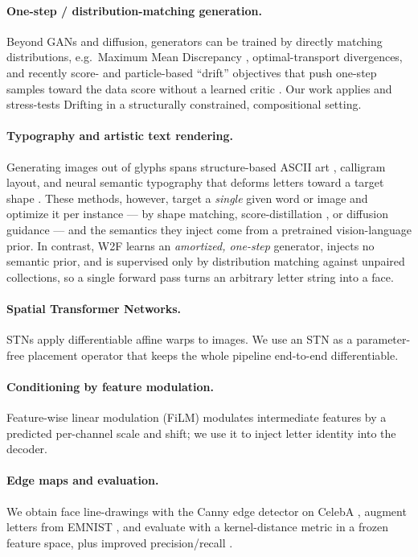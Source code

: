 \documentclass{article}
\begin{document}
\paragraph{One-step / distribution-matching generation.} Beyond GANs and diffusion, generators can be
trained by directly matching distributions, e.g.\ Maximum Mean Discrepancy \citep{li2015mmd},
optimal-transport divergences, and recently score- and particle-based ``drift'' objectives that push
one-step samples toward the data score \citep{song2019ncsn} without a learned critic
\citep{lambert2026drifting}. Our work
applies and stress-tests Drifting in a structurally constrained, compositional setting.
\paragraph{Typography and artistic text rendering.} Generating images out of glyphs spans
structure-based ASCII art \citep{xu2010ascii}, calligram layout, and neural semantic typography that
deforms letters toward a target shape \citep{iluz2023word,tanveer2023dsfusion}. These methods, however,
target a \emph{single} given word or image and optimize it per instance --- by shape matching,
score-distillation \citep{poole2023dreamfusion}, or diffusion guidance --- and the semantics they
inject come from a pretrained vision-language prior. In contrast, W2F learns an \emph{amortized, one-step} generator, injects no
semantic prior, and is supervised only by distribution matching against unpaired collections, so a
single forward pass turns an arbitrary letter string into a face.
\paragraph{Spatial Transformer Networks.} STNs \citep{jaderberg2015spatial} apply differentiable
affine warps to images. We use an STN as a parameter-free placement operator that keeps the whole
pipeline end-to-end differentiable. \paragraph{Conditioning by feature modulation.} Feature-wise
linear modulation (FiLM) \citep{perez2018film} modulates intermediate features by a predicted
per-channel scale and shift; we use it to inject letter identity into the decoder. \paragraph{Edge maps
and evaluation.} We obtain face line-drawings with the Canny edge detector \citep{canny1986} on CelebA
\citep{liu2015celeba}, augment letters from EMNIST \citep{cohen2017emnist}, and evaluate with a
kernel-distance metric \citep{binkowski2018kid} in a frozen feature space, plus improved
precision/recall \citep{kynkaanniemi2019pr}.
\end{document}
